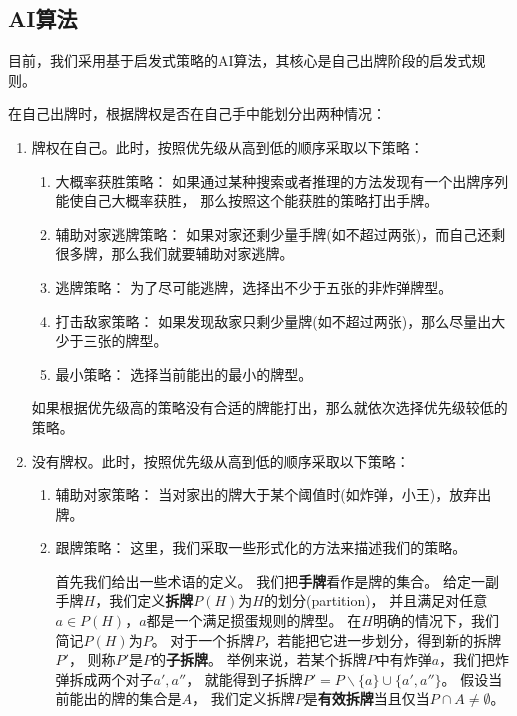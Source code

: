 \documentclass[a4paper]{ctexart}
\begin{document}
\subsection{AI算法} \label{subsec:ai-alg}
目前，我们采用基于启发式策略的AI算法，其核心是自己出牌阶段的启发式规则。

在自己出牌时，根据牌权是否在自己手中能划分出两种情况：
\begin{enumerate}
  \item 牌权在自己。此时，按照优先级从高到低的顺序采取以下策略：
  \begin{enumerate}
    \item 大概率获胜策略：
    如果通过某种搜索或者推理的方法发现有一个出牌序列能使自己大概率获胜，
    那么按照这个能获胜的策略打出手牌。

    \item 辅助对家逃牌策略：
    如果对家还剩少量手牌(如不超过两张)，而自己还剩很多牌，那么我们就要辅助对家逃牌。

    \item 逃牌策略：
    为了尽可能逃牌，选择出不少于五张的非炸弹牌型。

    \item 打击敌家策略：
    如果发现敌家只剩少量牌(如不超过两张)，那么尽量出大少于三张的牌型。

    \item 最小策略：
    选择当前能出的最小的牌型。
  \end{enumerate}
  如果根据优先级高的策略没有合适的牌能打出，那么就依次选择优先级较低的策略。

  \item 没有牌权。此时，按照优先级从高到低的顺序采取以下策略：
  \begin{enumerate}
    \item 辅助对家策略：
    当对家出的牌大于某个阈值时(如炸弹，小王)，放弃出牌。

    \item 跟牌策略：
    这里，我们采取一些形式化的方法来描述我们的策略。

    首先我们给出一些术语的定义。
    我们把\textbf{手牌}看作是牌的集合。
    给定一副手牌$H$，我们定义\textbf{拆牌}$P(H)$为$H$的划分(partition)，
    并且满足对任意$a \in P(H)$，$a$都是一个满足掼蛋规则的牌型。
    在$H$明确的情况下，我们简记$P(H)$为$P$。
    对于一个拆牌$P$，若能把它进一步划分，得到新的拆牌$P'$，
    则称$P'$是$P$的\textbf{子拆牌}。
    举例来说，若某个拆牌$P$中有炸弹$a$，我们把炸弹拆成两个对子$a',a''$，
    就能得到子拆牌$P'=P\backslash\{a\}\cup\{a',a''\}$。
    假设当前能出的牌的集合是$A$，
    我们定义拆牌$P$是\textbf{有效拆牌}当且仅当$P\cap A\neq \emptyset$。
 

\end{enumerate}
\end{enumerate}
\end{document}
